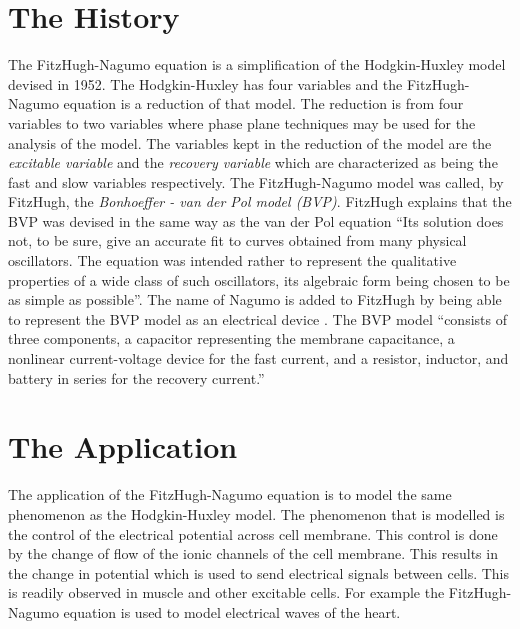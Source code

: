 \documentclass[12pt]{article}
\begin{document}

\section{The History}

The FitzHugh-Nagumo equation is a simplification of the Hodgkin-Huxley model devised in 1952.  The Hodgkin-Huxley has four variables and the FitzHugh-Nagumo equation is a reduction of that model.  The reduction is from four variables to two variables where phase plane techniques may be used for the analysis of the model.  The variables kept in the reduction of the model are the \emph{excitable variable} and the \emph{recovery variable} which are characterized as being the fast and slow variables respectively.  The FitzHugh-Nagumo model was called, by FitzHugh, the \emph{Bonhoeffer - van der Pol model (BVP)}.  FitzHugh explains that the BVP was devised in the same way as the van der Pol equation ``Its solution does not, to be sure, give an accurate fit to curves obtained from many physical oscillators.  The equation was intended rather to represent the qualitative properties of a wide class of such oscillators, its algebraic form being chosen to be as simple as possible''.\cite{FR}  The name of Nagumo is added to FitzHugh by being able to represent the BVP model as an electrical device \cite{NAY}. The BVP model ``consists of three components, a capacitor representing the membrane capacitance, a nonlinear current-voltage device for the fast current, and a resistor, inductor, and battery in series for the recovery current.''\cite{KS}



\section{The Application}

The application of the FitzHugh-Nagumo equation is to model the same phenomenon as the Hodgkin-Huxley model.  The phenomenon that is modelled is the control of the electrical potential across cell membrane.  This control is done by the change of flow of the ionic channels of the cell membrane.  This results in the change in potential which is used to send electrical signals between cells.  This is readily observed in muscle and other excitable cells.  For example the FitzHugh-Nagumo equation is used to model electrical waves of the heart.\cite{KS}  
\end{document}
